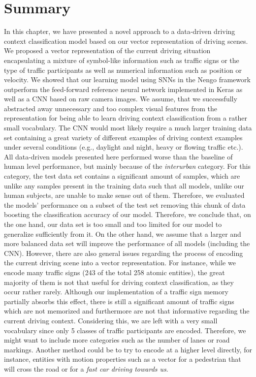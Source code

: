 \section{Summary}%
\label{sec:summary_context_classification}

In this chapter, we have presented a novel approach to a data-driven driving context classification model based on our vector representation of driving scenes.
We proposed a vector representation of the current driving situation encapsulating a mixture of symbol-like information such as traffic signs or the type of traffic participants as well as numerical information such as position or velocity.
We showed that our learning model using \acp{SNN} in the \ac{Nengo} framework outperform the feed-forward reference neural network implemented in Keras as well as a \ac{CNN} based on raw camera images.
We assume, that we successfully abstracted away unnecessary and too complex visual features from the representation for being able to learn driving context classification from a rather small vocabulary.
The \ac{CNN} would most likely require a much larger training data set containing a great variety of different examples of driving context examples under several conditions (e.g., daylight and night, heavy or flowing traffic etc.).
All data-driven models presented here performed worse than the baseline of human level performance, but mainly because of the \emph{interurban} category.
For this category, the test data set contains a significant amount of samples, which are unlike any samples present in the training data such that all models, unlike our human subjects, are unable to make sense out of them.
Therefore, we evaluated the models' performance on a subset of the test set removing this chunk of data boosting the classification accuracy of our model.
Therefore, we conclude that, on the one hand, our data set is too small and too limited for our model to generalize sufficiently from it.
On the other hand, we assume that a larger and more balanced data set will improve the performance of all models (including the \ac{CNN}). 
However, there are also general issues regarding the process of encoding the current driving scene into a vector representation.
For instance, while we encode many traffic signs (\num{243} of the total \num{258} atomic entities), the great majority of them is not that useful for driving context classification, as they occur rather rarely.
Although our implementation of a traffic sign memory partially absorbs this effect, there is still a significant amount of traffic signs which are not memorized and furthermore are not that informative regarding the current driving context.
Considering this, we are left with a very small vocabulary since only \num{5} classes of traffic participants are encoded.
Therefore, we might want to include more categories such as the number of lanes or road markings.
Another method could be to try to encode at a higher level directly, for instance, entities with motion properties such as a vector for a pedestrian that will cross the road or for a \emph{fast car driving towards us}.

